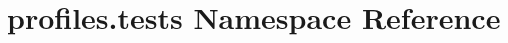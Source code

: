 \hypertarget{namespaceprofiles_1_1tests}{}\section{profiles.\+tests Namespace Reference}
\label{namespaceprofiles_1_1tests}

